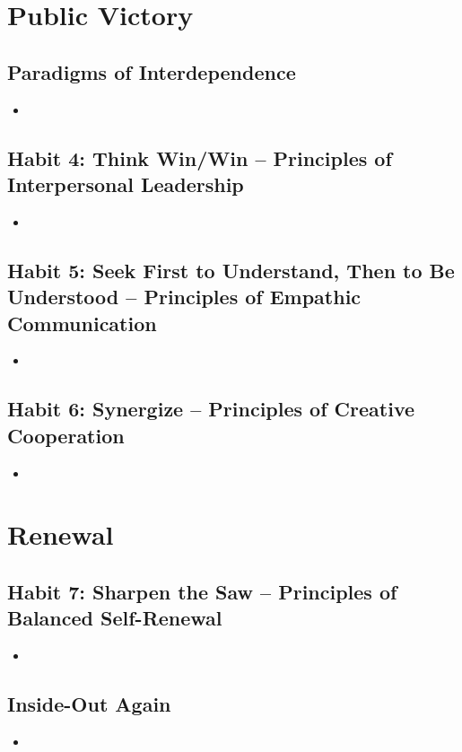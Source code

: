 \documentclass[11pt]{article}
\begin{document}
\section{Public Victory}
\subsection{Paradigms of Interdependence}
\begin{itemize}
\item 
\end{itemize}
\subsection{Habit 4: Think Win/Win -- Principles of Interpersonal Leadership}
\begin{itemize}
\item 
\end{itemize}
\subsection{Habit 5: Seek First to Understand, Then to Be Understood -- Principles of Empathic Communication}
\begin{itemize}
\item 
\end{itemize}
\subsection{Habit 6: Synergize -- Principles of Creative Cooperation}
\begin{itemize}
\item 
\end{itemize}
\section{Renewal}
\subsection{Habit 7: Sharpen the Saw -- Principles of Balanced Self-Renewal}
\begin{itemize}
\item 
\end{itemize}
\subsection{Inside-Out Again}
\begin{itemize}
\item 
\end{itemize}
\newpage


\end{document}
